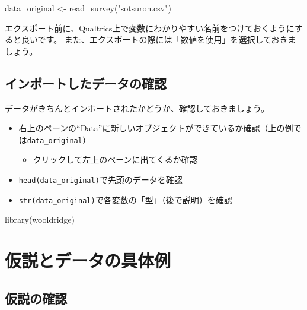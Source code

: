 \documentclass[
]{book}
\newenvironment{Shaded}{\begin{snugshade}}{\end{snugshade}}
\newcommand{\FunctionTok}[1]{\textcolor[rgb]{0.00,0.00,0.00}{#1}}
\newcommand{\NormalTok}[1]{#1}
\newcommand{\OtherTok}[1]{\textcolor[rgb]{0.56,0.35,0.01}{#1}}
\newcommand{\StringTok}[1]{\textcolor[rgb]{0.31,0.60,0.02}{#1}}
\providecommand{\tightlist}{%
  \setlength{\itemsep}{0pt}\setlength{\parskip}{0pt}}
\begin{document}
\begin{Shaded}
\begin{Highlighting}[]
\NormalTok{data\_original }\OtherTok{\textless{}{-}} \FunctionTok{read\_survey}\NormalTok{(}\StringTok{"sotsuron.csv"}\NormalTok{)}
\end{Highlighting}
\end{Shaded}

エクスポート前に、Qualtrics上で変数にわかりやすい名前をつけておくようにすると良いです。
また、エクスポートの際には「数値を使用」を選択しておきましょう。

\hypertarget{ux30a4ux30f3ux30ddux30fcux30c8ux3057ux305fux30c7ux30fcux30bfux306eux78baux8a8d}{%
\section{インポートしたデータの確認}\label{ux30a4ux30f3ux30ddux30fcux30c8ux3057ux305fux30c7ux30fcux30bfux306eux78baux8a8d}}

データがきちんとインポートされたかどうか、確認しておきましょう。

\begin{itemize}
\tightlist
\item
  右上のペーンの``Data''に新しいオブジェクトができているか確認（上の例では\texttt{data\_original}）

  \begin{itemize}
  \tightlist
  \item
    クリックして左上のペーンに出てくるか確認
  \end{itemize}
\item
  \texttt{head(data\_original)}で先頭のデータを確認
\item
  \texttt{str(data\_original)}で各変数の「型」（後で説明）を確認
\end{itemize}

\begin{Shaded}
\begin{Highlighting}[]
\FunctionTok{library}\NormalTok{(wooldridge)}
\end{Highlighting}
\end{Shaded}

\hypertarget{Hypotheses}{%
\chapter{仮説とデータの具体例}\label{Hypotheses}}

\hypertarget{ux4eeeux8aacux306eux78baux8a8d}{%
\section{仮説の確認}\label{ux4eeeux8aacux306eux78baux8a8d}}
\end{document}
